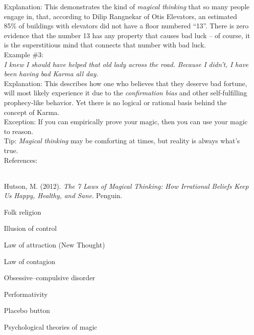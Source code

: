 \documentclass[a4paper,12pt,single,pdftex]{scrbook}
\begin{document}
{    
      Explanation: This demonstrates the kind of {\it magical thinking}  that so many people engage in, that, according to Dilip Rangnekar of Otis Elevators, an estimated 85\% of buildings with elevators did not have a floor numbered “13”.  There is zero evidence that the number 13 has any property that causes bad luck -- of course, it is the superstitious mind that connects that number with bad luck.
    \\

    
      Example \#3:
    \\

    
      {\em I knew I should have helped that old lady across the road.  Because I didn’t, I have been having bad Karma all day.}
    \\

    
      Explanation: This describes how one who believes that they deserve bad fortune, will most likely experience it due to the {\it confirmation bias} and other self-fulfilling prophecy-like behavior.  Yet there is no logical or rational basis behind the concept of Karma.
    \\

    
      Exception: If you can empirically prove your magic, then you can use your magic to reason.
    \\

    
      Tip: {\it Magical thinking} may be comforting at times, but reality is always what’s true.
    \\

    References:

    
      
        
      \\

      
        
          Hutson, M. (2012). {\it The 7 Laws of Magical Thinking: How Irrational Beliefs Keep Us Happy, Healthy, and Sane}. Penguin.
        
      
    
  }


Folk religion

Illusion of control

Law of attraction (New Thought)

Law of contagion

Obsessive–compulsive disorder

Performativity

Placebo button

Psychological theories of magic
\end{document}
